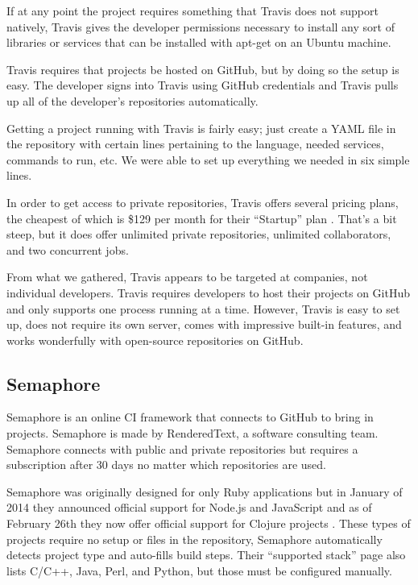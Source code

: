 \documentclass[12pt]{ucthesis}
\begin{document}
If at any point the project requires something that Travis does not support natively, Travis gives the developer permissions necessary to install any sort of libraries or services that can be installed with apt-get on an Ubuntu machine.

Travis requires that projects be hosted on GitHub, but by doing so the setup is easy. The developer signs into Travis using GitHub credentials and Travis pulls up all of the developer's repositories automatically. 

Getting a project running with Travis is fairly easy; just create a YAML file in the repository with certain lines pertaining to the language, needed services, commands to run, etc. We were able to set up everything we needed in six simple lines.

In order to get access to private repositories, Travis offers several pricing plans, the cheapest of which is \$129 per month for their ``Startup'' plan \cite{TravisPricing}. That's a bit steep, but it does offer unlimited private repositories, unlimited collaborators, and two concurrent jobs. 

From what we gathered, Travis appears to be targeted at companies, not individual developers. Travis requires developers to host their projects on GitHub and only supports one process running at a time. However, Travis is easy to set up, does not require its own server, comes with impressive built-in features, and works wonderfully with open-source repositories on GitHub.

\subsection{Semaphore}
Semaphore \cite{Semaphore} is an online CI framework that connects to GitHub to bring in projects. Semaphore is made by RenderedText, a software consulting team. Semaphore connects with public and private repositories but requires a subscription after 30 days no matter which repositories are used.

Semaphore was originally designed for only Ruby applications but in January of 2014 they announced official support for Node.js and JavaScript and as of February 26th they now offer official support for Clojure projects \cite{SemaphoreBlog}. These types of projects require no setup or files in the repository, Semaphore automatically detects project type and auto-fills build steps. Their ``supported stack'' page also lists C/C++, Java, Perl, and Python, but those must be configured manually. 
\end{document}

